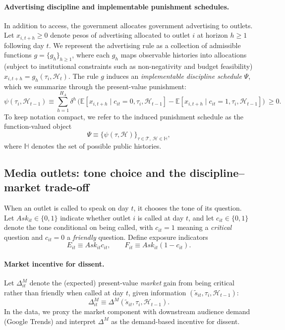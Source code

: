\documentclass[12pt]{article}
\begin{document}
\paragraph{Advertising discipline and implementable punishment schedules.}
In addition to access, the government allocates government advertising to outlets. Let $x_{i,t+h}\ge 0$ denote pesos of advertising allocated to outlet $i$ at horizon $h\ge 1$ following day $t$. We represent the advertising rule as a collection of admissible functions $g=\{g_h\}_{h\ge 1}$, where each $g_h$ maps observable histories into allocations (subject to institutional constraints such as non-negativity and budget feasibility) $x_{i,t+h}=g_h(\tau_i,\mathcal{H}_{t})$. The rule $g$ induces an \emph{implementable discipline schedule} $\Psi$, which we summarize through the present-value punishment:
\begin{equation}\label{eq:psiPV}
\psi(\tau_i,\mathcal{H}_{t-1})
\equiv
\sum_{h=1}^{H_A}\delta^{h}\,
\Big(
\mathbb{E}[x_{i,t+h}\mid c_{it}=0,\tau_i,\mathcal{H}_{t-1}]
-
\mathbb{E}[x_{i,t+h}\mid c_{it}=1,\tau_i,\mathcal{H}_{t-1}]
\Big)\ \ge 0.
\end{equation}
To keep notation compact, we refer to the induced punishment schedule as the function-valued object
\[
\Psi \equiv \{\psi(\tau,\mathcal{H})\}_{\tau\in\mathcal{T},\ \mathcal{H}\in\mathbb{H}},
\]
where $\mathbb{H}$ denotes the set of possible public histories.

\subsection{Media outlets: tone choice and the discipline--market trade-off}

When an outlet is called to speak on day $t$, it chooses the tone of its question. Let $Ask_{it}\in\{0,1\}$ indicate whether outlet $i$ is called at day $t$, and let $c_{it}\in\{0,1\}$ denote the tone conditional on being called, with $c_{it}=1$ meaning a \emph{critical} question and $c_{it}=0$ a \emph{friendly} question. Define exposure indicators
\[
E_{it}\equiv Ask_{it}c_{it}, \qquad F_{it}\equiv Ask_{it}(1-c_{it}).
\]

\paragraph{Market incentive for dissent.}
Let $\Delta^{M}_{it}$ denote the (expected) present-value \emph{market} gain from being critical rather than friendly when called at day $t$, given information $(\tilde{s}_{it},\tau_i,\mathcal{H}_{t-1})$:
\[
\Delta^{M}_{it}
\equiv
\Delta^{M}(\tilde{s}_{it},\tau_i,\mathcal{H}_{t-1}).
\]
In the data, we proxy the market component with downstream audience demand (Google Trends) and interpret $\Delta^M$ as the demand-based incentive for dissent.
\end{document}
